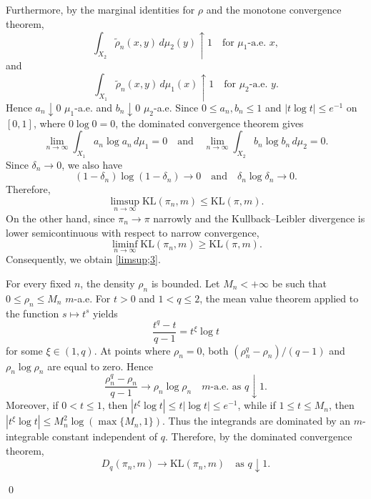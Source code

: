 \documentclass[a4paper,11pt]{article}
\theoremstyle{plain}
\theoremstyle{definition}
\theoremstyle{remark}
\theoremstyle{plain}
\newenvironment{pf}[1]
{{\noindent\textbf{Proof of #1.}}}{\hfill \qed}
\numberwithin{equation}{section}
\newcommand{\dl}{\delta}
\newcommand{\1}{\mbox{1}\hspace{-0.25em}\mbox{l}} %
\begin{document}
\begin{pf}{Theorem \ref{thm;narrow}}
Furthermore, by the marginal identities for $\rho$ and the monotone convergence theorem,
\begin{equation*}
\int_{X_2}\tilde{\rho}_n(x,y)\,d\mu_2(y)\uparrow1
\quad\text{for $\mu_1$-a.e. }x,
\end{equation*}
and
\begin{equation*}
\int_{X_1}\tilde{\rho}_n(x,y)\,d\mu_1(x)\uparrow1
\quad\text{for $\mu_2$-a.e. }y.
\end{equation*}
Hence $a_n\downarrow0$ $\mu_1$-a.e. and $b_n\downarrow0$ $\mu_2$-a.e. Since $0\leq a_n,b_n\leq1$ and $|t\log t|\leq e^{-1}$ on $[0,1]$, where $0\log0=0$, the dominated convergence theorem gives
\begin{equation*}
\lim_{n\to\infty}\int_{X_1}a_n\log a_n\,d\mu_1=0 \quad\mathrm{and}\quad
\lim_{n\to\infty}\int_{X_2}b_n\log b_n\,d\mu_2=0.
\end{equation*}
Since $\dl_n\to0$, we also have
\begin{equation*}
(1-\dl_n)\log(1-\dl_n)\to0 \quad\mathrm{and}\quad \dl_n\log\dl_n\to0.
\end{equation*}
Therefore,
\begin{equation*}
\limsup_{n\to\infty}\mathrm{KL}(\pi_n,m)\leq\mathrm{KL}(\pi,m).
\end{equation*}
On the other hand, since $\pi_n\to\pi$ narrowly and the Kullback--Leibler divergence is lower semicontinuous with respect to narrow convergence,
\begin{equation*}
\liminf_{n\to\infty}\mathrm{KL}(\pi_n,m)\geq\mathrm{KL}(\pi,m).
\end{equation*}
Consequently, we obtain \eqref{limsup;3}.

For every fixed $n$, the density $\rho_n$ is bounded. Let $M_n<+\infty$ be such that $0\leq\rho_n\leq M_n$ $m$-a.e. For $t>0$ and $1<q\leq2$, the mean value theorem applied to the function $s\mapsto t^s$ yields
\begin{equation*}
\frac{t^q-t}{q-1}=t^\xi\log t
\end{equation*}
for some $\xi\in(1,q)$. At points where $\rho_n=0$, both $(\rho_n^q-\rho_n)/(q-1)$ and $\rho_n\log\rho_n$ are equal to zero. Hence
\begin{equation*}
\frac{\rho_n^q-\rho_n}{q-1}\to\rho_n\log\rho_n \quad m\text{-a.e. as }q \downarrow 1.
\end{equation*}
Moreover, if $0<t\leq1$, then $|t^\xi\log t|\leq t|\log t|\leq e^{-1}$, while if $1\leq t\leq M_n$, then $|t^\xi\log t|\leq M_n^2\log(\max\{M_n,1\})$. Thus the integrands are dominated by an $m$-integrable constant independent of $q$. Therefore, by the dominated convergence theorem,
\begin{equation*}
D_q(\pi_n,m)\to\mathrm{KL}(\pi_n,m)
\quad\text{as }q\downarrow1.
\end{equation*}


\end{pf}
\end{document}
